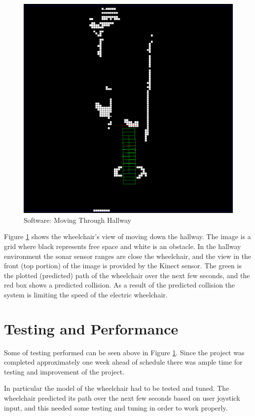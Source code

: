 \documentclass[oneside,final,a4paper]{report}
\begin{document}
\begin{figure}[hbt]
 \centering
 \includegraphics[scale=0.2]{avoid_hallway}
 \caption{Software: Moving Through Hallway}
 \label{fig:soft_moving}
\end{figure}

Figure \ref{fig:soft_moving} shows the wheelchair's view of moving down the hallway. The image is a grid where black represents free space and white is an obstacle. In the hallway environment the sonar sensor ranges are close the wheelchair, and the view in the front (top portion) of the image is provided by the Kinect sensor. The green is the plotted (predicted) path of the wheelchair over the next few seconds, and the red box shows a predicted collision. As a result of the predicted collision the system is limiting the speed of the electric wheelchair.


\section{Testing and Performance}
Some of testing performed can be seen above in Figure \ref{fig:soft_moving}. Since the project was completed approximately one week ahead of schedule there was ample time for testing and improvement of the project.

In particular the model of the wheelchair had to be tested and tuned. The wheelchair predicted its path over the next few seconds based on user joystick input, and this needed some testing and tuning in order to work properly.
\end{document}
